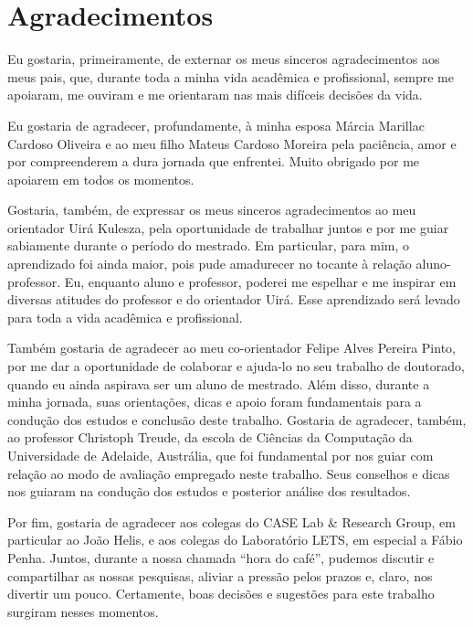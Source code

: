 
\chapter*{Agradecimentos}

Eu gostaria, primeiramente, de externar os meus sinceros agradecimentos aos meus pais, que, durante toda a minha vida acadêmica e profissional, sempre me apoiaram, me ouviram e me orientaram nas mais difíceis decisões da vida.

Eu gostaria de agradecer, profundamente, à minha esposa Márcia Marillac Cardoso Oliveira e ao meu filho Mateus Cardoso Moreira pela paciência, amor e por compreenderem a dura jornada que enfrentei. Muito obrigado por me apoiarem em todos os momentos.

Gostaria, também, de expressar os meus sinceros agradecimentos ao meu orientador Uirá Kulesza, pela oportunidade de trabalhar juntos e por me guiar sabiamente durante o período do mestrado. Em particular, para mim, o aprendizado foi ainda maior, pois pude amadurecer no tocante à relação aluno-professor. Eu, enquanto aluno e professor, poderei me espelhar e me inspirar em diversas atitudes do professor e do orientador Uirá. Esse aprendizado será levado para toda a vida acadêmica e profissional.

Também gostaria de agradecer ao meu co-orientador Felipe Alves Pereira Pinto, por me dar a oportunidade de colaborar e ajuda-lo no seu trabalho de doutorado, quando eu ainda aspirava ser um aluno de mestrado. Além disso, durante a minha jornada, suas orientações, dicas e apoio foram fundamentais para a condução dos estudos e conclusão deste trabalho. Gostaria de agradecer, também, ao professor Christoph Treude, da escola de Ciências da Computação da Universidade de Adelaide, Austrália, que foi fundamental por nos guiar com relação ao modo de avaliação empregado neste trabalho. Seus conselhos e dicas nos guiaram na condução dos estudos e posterior análise dos resultados.

Por fim, gostaria de agradecer aos colegas do CASE Lab \& Research Group, em particular ao João Helis, e aos colegas do Laboratório LETS, em especial a Fábio Penha. Juntos, durante a nossa chamada ``hora do café'', pudemos discutir e compartilhar as nossas pesquisas, aliviar a pressão pelos prazos e, claro, nos divertir um pouco. Certamente, boas decisões e sugestões para este trabalho surgiram nesses momentos.